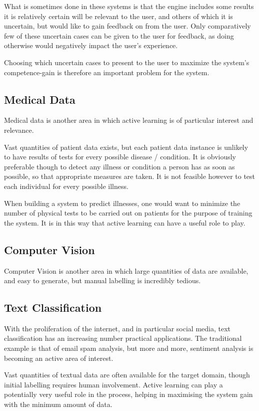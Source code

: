 \documentclass[a4paper,11pt]{report}
\begin{document}
What is sometimes done in these systems is that the engine includes some results it is relatively certain will be relevant to the user, and others of which it is uncertain, but would like to gain feedback on from the user. Only comparatively few of these uncertain cases can be given to the user for feedback, as doing otherwise would negatively impact the user's experience.

Choosing which uncertain cases to present to the user to maximize the system's competence-gain is therefore an important problem for the system.

\subsection{Medical Data}
Medical data is another area in which active learning is of particular interest and relevance.

Vast quantities of patient data exists, but each patient data instance is unlikely to have results of tests for every possible disease / condition. It is obviously preferable though to detect any illness or condition a person has as soon as possible, so that appropriate measures are taken. It is not feasible however to test each individual for every possible illness.

When building a system to predict illnesses, one would want to minimize the number of physical tests to be carried out on patients for the purpose of training the system. It is in this way that active learning can have a useful role to play.

\subsection{Computer Vision}
Computer Vision is another area in which large quantities of data are available, and easy to generate, but manual labelling is incredibly tedious.

\subsection{Text Classification}
With the proliferation of the internet, and in particular social media, text classification has an increasing number practical applications. The traditional example is that of email spam analysis, but more and more, sentiment analysis is becoming an active area of interest.

Vast quantities of textual data are often available for the target domain, though initial labelling requires human involvement. Active learning can play a potentially very useful role in the process, helping in maximising the system gain with the minimum amount of data.
\end{document}
